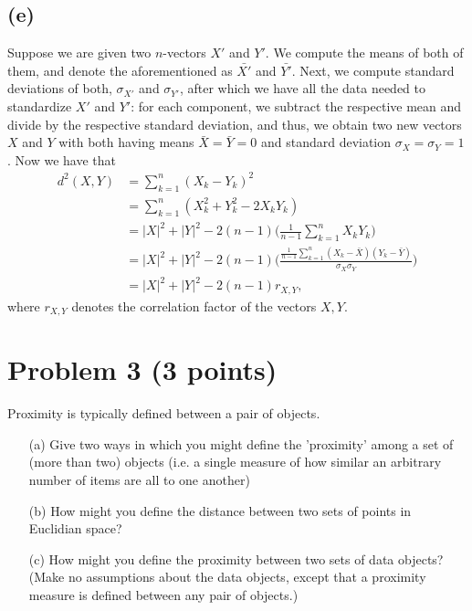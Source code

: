 \documentclass[10pt]{article}
\begin{document}
\subsection*{(e)}
Suppose we are given two $n$-vectors $X'$ and $Y'$. We compute the means of both of them, and denote the aforementioned as $\bar{X'}$ and $\bar{Y'}$. Next, we compute standard deviations of both, $\sigma_{X'}$ and $\sigma_{Y'}$, after which we have all the data needed to standardize $X'$ and $Y'$: for each component, we subtract the respective mean and divide by the respective standard deviation, and thus, we obtain two new vectors $X$ and $Y$ with both having means $\bar{X} = \bar{Y} = 0$ and standard deviation $\sigma_X = \sigma_Y = 1$.  Now we have that
\begin{align*}
d^2(X, Y) &= \sum_{k = 1}^n (X_k - Y_k)^2 \\
                 &= \sum_{k = 1}^n (X_k^2 + Y_k^2 - 2X_k Y_k) \\
                 &= |X|^2 + |Y|^2 - 2(n - 1) \Bigg( \frac{1}{n - 1} \sum_{k = 1}^n X_k Y_k \Bigg) \\
                 &= |X|^2 + |Y|^2 - 2(n - 1) \Bigg( \frac{\frac{1}{n - 1} \sum_{k = 1}^n (X_k - \bar{X})(Y_k - \bar{Y})}{\sigma_X \sigma_Y}\Bigg) \\
                 &= |X|^2 + |Y|^2 - 2(n - 1)r_{X, Y},
\end{align*}
where $r_{X, Y}$ denotes the correlation factor of the vectors $X, Y$.


\color{blue}
\section*{Problem 3 (3 points)}
Proximity is typically defined between a pair of objects.
\begin{itemize}
\item[(a)] Give two ways in which you might define the 'proximity' among a set of (more than two) objects (i.e. a single measure of how similar an arbitrary number of items are all to one another)
\item[(b)] How might you define the distance between two sets of points in Euclidian space?
\item[(c)] How might you define the proximity between two sets of data objects? (Make no assumptions about the data objects, except that a proximity measure is defined between any pair of objects.)
\end{itemize}
\end{document}
